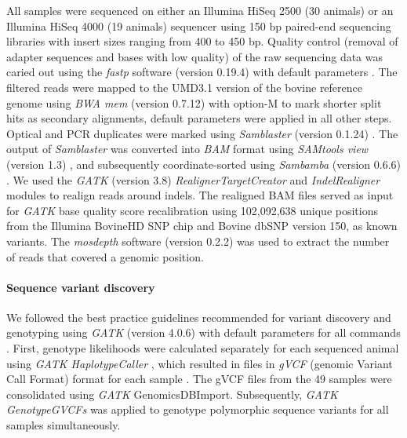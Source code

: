 \documentclass[../main.tex]{subfiles}
\begin{document}
All samples were sequenced on either an Illumina HiSeq 2500 (30 animals) or an Illumina HiSeq 4000 (19 animals) sequencer using 150 bp paired-end sequencing libraries with insert sizes ranging from 400 to 450 bp. Quality control (removal of adapter sequences and bases with low quality) of the raw sequencing data was caried out using the \emph{fastp} software (version 0.19.4) with default parameters \citep{chen2018fastp}. The filtered reads were mapped to the UMD3.1 version of the bovine reference genome \citep{zimin2009whole} using \emph{BWA mem} (version 0.7.12) \citep{li2009fast} with option-M to mark shorter split hits as secondary alignments, default parameters were applied in all other steps. Optical and PCR duplicates were marked using \emph{Samblaster} (version 0.1.24) \citep{faust2014samblaster}. The output of \emph{Samblaster} was converted into \emph{BAM} format using \emph{SAMtools view} (version 1.3) \citep{li2009sequence}, and subsequently coordinate-sorted using \emph{Sambamba} (version 0.6.6) \citep{tarasov2015sambamba}. We used the \emph{GATK} (version 3.8) \emph{RealignerTargetCreator} and \emph{IndelRealigner} modules to realign reads around indels. The realigned BAM files served as input for \emph{GATK} base quality score recalibration using 102,092,638 unique positions from the Illumina BovineHD SNP chip and Bovine dbSNP version 150, as known variants. The \emph{mosdepth} software (version 0.2.2) \citep{pedersen2018mosdepth} was used to extract the number of reads that covered a genomic position.

\paragraph{Sequence variant discovery}

We followed the best practice guidelines recommended for variant discovery and genotyping using \emph{GATK} (version 4.0.6) with default parameters for all commands \citep{mckenna2010genome,vander2018best,depristo2011framework}. First, genotype likelihoods were calculated separately for each sequenced animal using \emph{GATK HaplotypeCaller} \citep{vander2018best}, which resulted in files in \emph{gVCF} (genomic Variant Call Format) format for each sample \citep{danecek2011variant}. The gVCF files from the 49 samples were consolidated using \emph{GATK} GenomicsDBImport. Subsequently, \emph{GATK GenotypeGVCFs} was applied to genotype polymorphic sequence variants for all samples simultaneously.
\end{document}
